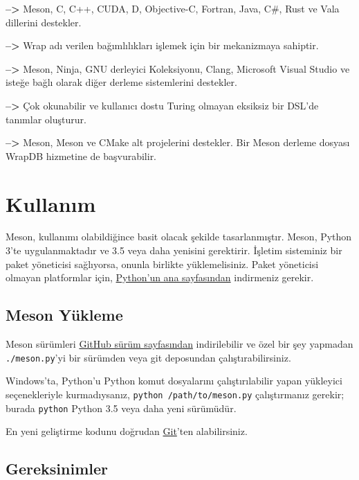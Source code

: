 \documentclass[
]{book}
\begin{document}
\textbf{--\textgreater{}} Meson, C, C++, CUDA, D, Objective-C, Fortran, Java, C\#, Rust ve Vala dillerini destekler.

\textbf{--\textgreater{}} Wrap adı verilen bağımlılıkları işlemek için bir mekanizmaya sahiptir.

\textbf{--\textgreater{}} Meson, Ninja, GNU derleyici Koleksiyonu, Clang, Microsoft Visual Studio ve isteğe bağlı olarak diğer derleme sistemlerini destekler.

\textbf{--\textgreater{}} Çok okunabilir ve kullanıcı dostu Turing olmayan eksiksiz bir DSL'de tanımlar oluşturur.

\textbf{--\textgreater{}} Meson, Meson ve CMake alt projelerini destekler. Bir Meson derleme dosyası WrapDB hizmetine de başvurabilir.

\hypertarget{kullanux131m-4}{%
\section*{Kullanım}\label{kullanux131m-4}}

Meson, kullanımı olabildiğince basit olacak şekilde tasarlanmıştır.
Meson, Python 3'te uygulanmaktadır ve 3.5 veya daha yenisini gerektirir. İşletim sisteminiz bir paket yöneticisi sağlıyorsa, onunla birlikte yüklemelisiniz. Paket yöneticisi olmayan platformlar için,
\href{https://www.python.org/downloads/}{Python'un ana sayfasından} indirmeniz gerekir.

\hypertarget{meson-yuxfckleme}{%
\subsection{Meson Yükleme}\label{meson-yuxfckleme}}

Meson sürümleri \href{https://github.com/mesonbuild/meson/releases}{GitHub sürüm sayfasından} indirilebilir ve özel bir şey yapmadan \texttt{./meson.py}'yi bir sürümden veya git deposundan çalıştırabilirsiniz.

Windows'ta, Python'u Python komut dosyalarını çalıştırılabilir yapan yükleyici seçenekleriyle kurmadıysanız, \texttt{python\ /path/to/meson.py} çalıştırmanız gerekir; burada \texttt{python} Python 3.5 veya daha yeni sürümüdür.

En yeni geliştirme kodunu doğrudan \href{https://github.com/mesonbuild/meson}{Git}'ten alabilirsiniz.

\hypertarget{gereksinimler}{%
\subsection{Gereksinimler}\label{gereksinimler}}
\end{document}
